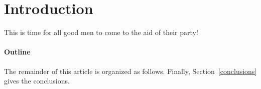 \section{Introduction}
This is time for all good men to come to the aid of their party!

\paragraph{Outline}
The remainder of this article is organized as follows.
Finally, Section~\ref{conclusions} gives the conclusions\cite{Gil:02}.
